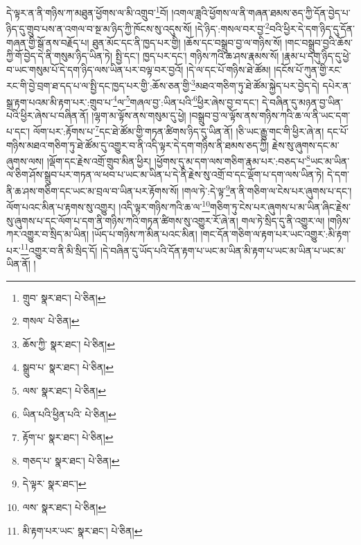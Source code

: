 དེ་ལྟར་ན་ནི་གཉིས་ཀ་མཐུན་ཕྱོགས་ལ་མི་འགྲུབ་\footnote{གྲུབ་  སྣར་ཐང་།  པེ་ཅིན། }བོ། །འགལ་ཟླའི་ཕྱོགས་ལ་ནི་གཞན་ཐམས་ཅད་ཀྱི་དོན་བྱེད་པ་ཉིད་དུ་གྲུབ་པས་ན་འགལ་བ་སྔ་མ་ཉིད་ཀྱི་ཁོངས་སུ་འདུས་སོ། །དེ་ཉིད་:གསལ་བར་བྱ་\footnote{གསལ་  པེ་ཅིན། }བའི་ཕྱིར་དེ་དག་ཉིད་དུ་དོན་གཞན་གྱི་སྒོ་ནས་བརྗོད་པ། ཐུན་མོང་དང་ནི་ཁྱད་པར་གྱི། །ཆོས་དང་བསྒྲུབ་བྱ་ལ་གཉིས་སོ། །གང་བསྒྲུབ་བྱའི་ཆོས་ཀྱི་གོ་བྱེད་དེ་ནི་གསུམ་ཉིད་ཡིན་ཏེ། སྤྱི་དང་། ཁྱད་པར་དང་། གཉིས་ཀའི་ཆ་ཤས་རྣམས་སོ། །རྣམ་པ་དགུ་ཉིད་དུ་ཕྱེ་བ་ཡང་གསུམ་པོ་དེ་དག་ཉིད་ལས་ཡིན་པར་བལྟ་བར་བྱའོ། །དེ་ལ་དང་པོ་གཉིས་ཐེ་ཚོམ། །དངོས་པོ་ཀུན་གྱི་རང་རང་གི་བྱེ་བྲག་ཐ་དད་པ་ལ་སྤྱི་དང་ཁྱད་པར་གྱི་:ཆོས་ཅན་གྱི་\footnote{ཆོས་ཀྱི་  སྣར་ཐང་།  པེ་ཅིན། }མཐའ་གཅིག་ཏུ་ཐེ་ཚོམ་སྐྱེད་པར་བྱེད་དེ། དཔེར་ན་སྒྲ་རྟག་པའམ་མི་རྟག་པར་:གྲུབ་པ་\footnote{སྒྲུབ་པ་  སྣར་ཐང་།  པེ་ཅིན། }ལ་\footnote{ལས་  སྣར་ཐང་།  པེ་ཅིན། }གཞལ་བྱ་:ཡིན་པའི་\footnote{ཡིན་པའི་ཕྱིན་པའི་  པེ་ཅིན། }ཕྱིར་ཞེས་བྱ་བ་དང་། དེ་བཞིན་དུ་མཉན་བྱ་ཡིན་པའི་ཕྱིར་ཞེས་པ་བཞིན་ནོ། །ལྷག་མ་ལྟོས་ནས་གསུམ་དུ་ཕྱེ། །བསྒྲུབ་བྱ་ལ་ལྟོས་ནས་གཉིས་ཀའི་ཆ་ལ་ནི་ཡང་དག་པ་དང་། ལོག་པར་:རྟོགས་པ་\footnote{རྟོག་པ་  སྣར་ཐང་།  པེ་ཅིན། }དང་ཐེ་ཚོམ་གྱི་གཏན་ཚིགས་ཉིད་དུ་ཡིན་ནོ། །ཅི་ཡང་རྒྱུ་གང་གི་ཕྱིར་ཞེ་ན། དང་པོ་གཉིས་མཐའ་གཅིག་ཏུ་ཐེ་ཚོམ་དུ་འགྱུར་བ་ནི་འདི་ལྟར་དེ་དག་གཉིས་ནི་ཐམས་ཅད་ཀྱི། རྗེས་སུ་ཞུགས་དང་མ་ཞུགས་ལས། །ལྡོག་དང་རྗེས་འགྲོ་གྲུབ་མིན་ཕྱིར། །ཕྱོགས་དུ་མ་དག་ལས་གཅིག་རྣམ་པར་:བཅད་པ་\footnote{གཅད་པ་  སྣར་ཐང་།  པེ་ཅིན། }ཡང་མ་ཡིན་ལ་ཅིག་ཤོས་སྒྲུབ་པར་གཏན་ལ་ཕབ་པ་ཡང་མ་ཡིན་པ་དེ་ནི་རྗེས་སུ་འགྲོ་བ་དང་ལྡོག་པ་དག་ལས་ཡིན་ཏེ། དེ་དག་ནི་ཆ་ཤས་གཅིག་དང་ཡང་མ་བྲལ་བ་ཡིན་པར་རྟོགས་སོ། །གལ་ཏེ་:དེ་ལྟ་\footnote{དེ་ལྟར་  སྣར་ཐང་། }ན་ནི་གཅིག་ལ་ངེས་པར་ཞུགས་པ་དང་། ལོག་པའང་མིན་པ་རྟགས་སུ་འགྱུར། །འདི་ལྟར་གཉིས་ཀའི་ཆ་ལ་\footnote{ལས་  སྣར་ཐང་།  པེ་ཅིན། }གཅིག་ཏུ་ངེས་པར་ཞུགས་པ་མ་ཡིན་ཞིང་རྗེས་སུ་ཞུགས་པ་དང་ལོག་པ་དག་ནི་གཉིས་ཀའི་གཏན་ཚིགས་སུ་འགྱུར་རོ་ཞེ་ན། གལ་ཏེ་སྲིད་དུ་ནི་འགྱུར་ལ། །གཉིས་ཀར་འགྱུར་བ་སྲིད་མ་ཡིན། །ཡོད་པ་གཉིས་ཀ་མིན་པའང་མིན། །གང་དོན་གཅིག་ལ་རྟག་པར་ཡང་འགྱུར་:མི་རྟག་པར་\footnote{མི་རྟག་པར་ཡང་  སྣར་ཐང་།  པེ་ཅིན། }འགྱུར་བ་ནི་མི་སྲིད་དོ། །དེ་བཞིན་དུ་ཡོད་པའི་དོན་རྟག་པ་ཡང་མ་ཡིན་མི་རྟག་པ་ཡང་མ་ཡིན་པ་ཡང་མ་ཡིན་ནོ། །
